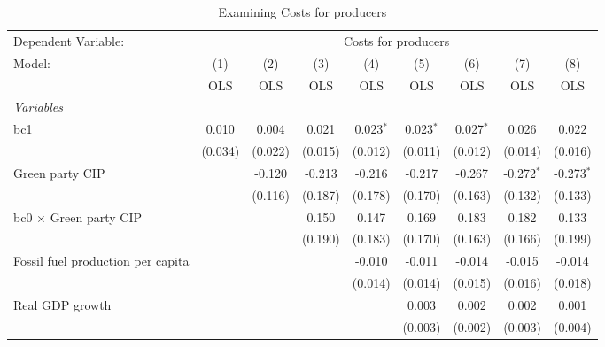 
\begin{table}[htbp]
   \caption{Examining Costs for producers}
   \centering
   \begin{tabular}{lcccccccc}
      \toprule
      Dependent Variable: & \multicolumn{8}{c}{Costs for producers}\\
      Model:                                  & (1)     & (2)     & (3)     & (4)         & (5)         & (6)         & (7)          & (8)\\  
                                              &  OLS    & OLS     & OLS     & OLS         & OLS         & OLS         & OLS          & OLS\\  
      \midrule
      \emph{Variables}\\
      bc1                                     & 0.010   & 0.004   & 0.021   & 0.023$^{*}$ & 0.023$^{*}$ & 0.027$^{*}$ & 0.026        & 0.022\\   
                                              & (0.034) & (0.022) & (0.015) & (0.012)     & (0.011)     & (0.012)     & (0.014)      & (0.016)\\   
      Green party CIP                         &         & -0.120  & -0.213  & -0.216      & -0.217      & -0.267      & -0.272$^{*}$ & -0.273$^{*}$\\   
                                              &         & (0.116) & (0.187) & (0.178)     & (0.170)     & (0.163)     & (0.132)      & (0.133)\\   
      bc0 $\times$ Green party CIP            &         &         & 0.150   & 0.147       & 0.169       & 0.183       & 0.182        & 0.133\\   
                                              &         &         & (0.190) & (0.183)     & (0.170)     & (0.163)     & (0.166)      & (0.199)\\   
      Fossil fuel production per capita       &         &         &         & -0.010      & -0.011      & -0.014      & -0.015       & -0.014\\   
                                              &         &         &         & (0.014)     & (0.014)     & (0.015)     & (0.016)      & (0.018)\\   
      Real GDP growth                         &         &         &         &             & 0.003       & 0.002       & 0.002        & 0.001\\   
                                              &         &         &         &             & (0.003)     & (0.002)     & (0.003)      & (0.004)\\   

\end{tabular}
\end{table}
